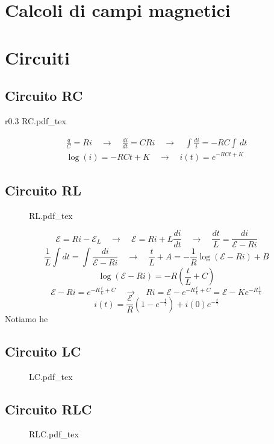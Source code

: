 \documentclass[x11names]{report}
\newcommand{\incfig}[1]{%
	{#1.pdf_tex}
}
\begin{document}
\section{Calcoli di campi magnetici}

\section{Circuiti}
\subsection{Circuito RC}
\begin{wrapfigure}{r}{0.3\textwidth}
	\incfig{RC}
\end{wrapfigure}
\begin{gather*}
	\frac{q}{C}=Ri \quad \to \quad \frac{di}{dt} = CRi \quad \to \quad \int\frac{di}{i} = -RC \int \, dt \\
	\log(i) =- RC t + K \quad \to \quad i(t) = e^{-RCt + K}
\end{gather*}




\subsection{Circuito RL}
\begin{figure}[H]
	\centering
	\incfig{RL}
\end{figure}
\[
\mathcal{E} = Ri - \mathcal{E}_L \quad \to \quad \mathcal{E} = Ri + L\frac{di}{dt} \quad \to \quad \frac{dt}{L} = \frac{di}{\mathcal{E}-Ri}
\]
\[
\frac{1}{L}\int dt = \int \frac{di}{\mathcal{E}-Ri} \quad \to \quad \frac{t}{L} + A = -\frac{1}{R}\log\left(\mathcal{E} - Ri\right) + B
\]
\[
\log\left(\mathcal{E} - Ri\right) = -R\left(\frac{t}{L} + C\right)
\]
\[
\mathcal{E} - Ri = e^{-R\frac{t}{L} + C}  \quad \to \quad Ri = \mathcal{E} - e^{-R\frac{t}{L} + C} = \mathcal{E} - Ke^{-R\frac{t}{L}}
\]
\[
i(t) = \frac{\mathcal{E}}{R}\left(1 - e^{-\frac{t}{\tau}}\right) + i(0)e^{-\frac{t}{\tau}}
\]
Notiamo he

\subsection{Circuito LC}
\begin{figure}[H]
	\centering
	\incfig{LC}
\end{figure}

\subsection{Circuito RLC}
\begin{figure}[H]
	\centering
	\incfig{RLC}
\end{figure}
\end{document}
